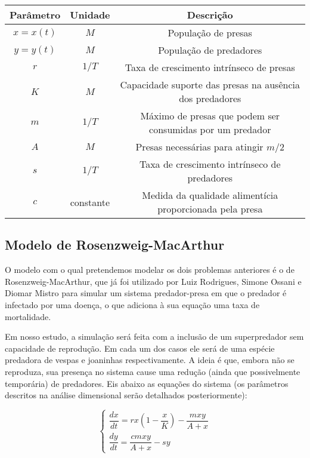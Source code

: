\begin{center}
\begin{tabular}{| c | c | c |}
\hline
Parâmetro & Unidade & Descrição\\
\hline
$x=x(t)$ & $M$ & População de presas\\
$y=y(t)$ & $M$ & População de predadores\\
$r$ & $1/T$ & Taxa de crescimento intrínseco de presas\\
$K$ & $M$ & Capacidade suporte das presas na ausência dos predadores\\
$m$ & $1/T$ & Máximo de presas que podem ser consumidas por um predador\\
$A$ & $M$ & Presas necessárias para atingir $m/2$\\
$s$ & $1/T$ & Taxa de crescimento intrínseco de predadores\\
$c$ & constante & Medida da qualidade alimentícia proporcionada pela presa\\
\hline
\end{tabular}
\end{center}

\newpage

\subsection{Modelo de Rosenzweig-MacArthur}

O modelo com o qual pretendemos modelar os dois problemas anteriores é o de Rosenzweig-MacArthur, que já foi utilizado por Luiz Rodrigues, Simone Ossani e Diomar Mistro para simular um sistema predador-presa em que o predador é infectado por uma doença, o que adiciona à sua equação uma taxa de mortalidade. 

Em nosso estudo, a simulação será feita com a inclusão de um superpredador sem capacidade de reprodução. Em cada um dos casos ele será de uma espécie predadora de vespas e joaninhas respectivamente. A ideia é que, embora não se reproduza, sua presença no sistema cause uma redução (ainda que possivelmente temporária) de predadores. Eis abaixo as equações do sistema (os parâmetros descritos na análise dimensional serão detalhados posteriormente):

$$\left\{
\begin{array}{l}
\dfrac{dx}{dt}=rx\left(1-\dfrac{x}{K}\right)-\dfrac{mxy}{A+x}\\
\dfrac{dy}{dt}=\dfrac{cmxy}{A+x}-sy
\end{array}
\right.$$

